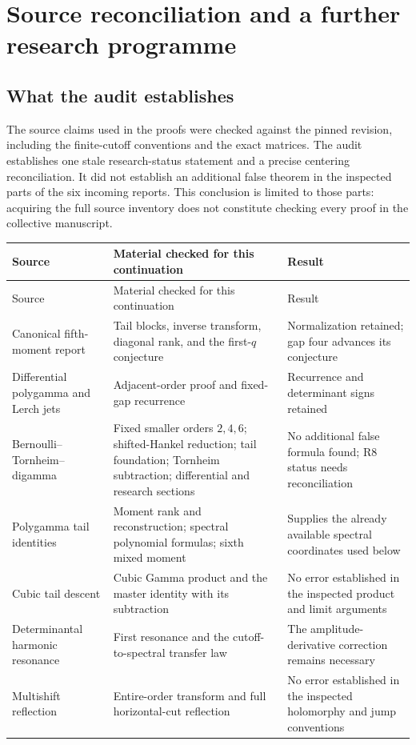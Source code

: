 \section{Source reconciliation and a further research programme}
\label{sec:audit}

\subsection{What the audit establishes}

The source claims used in the proofs were checked against the pinned
revision, including the finite-cutoff conventions and the exact matrices.
The audit establishes one stale research-status statement and a precise
centering reconciliation. It did not establish an additional false theorem
in the inspected parts of the six incoming reports. This conclusion is
limited to those parts: acquiring the full source inventory does not
constitute checking every proof in the collective manuscript.

\begin{longtable}{@{}>{\raggedright\arraybackslash}p{}>{\raggedright\arraybackslash}p{}>{\raggedright\arraybackslash}p{}@{}}
\toprule
Source & Material checked for this continuation & Result \\
\midrule
\endfirsthead
\toprule
Source & Material checked for this continuation & Result \\
\midrule
\endhead
Canonical fifth-moment report \cite{Canonical} &
Tail blocks, inverse transform, diagonal rank, and the first-$q$ conjecture &
Normalization retained; gap four advances its conjecture \\
Differential polygamma and Lerch jets \cite{Differential} &
Adjacent-order proof and fixed-gap recurrence &
Recurrence and determinant signs retained \\
Bernoulli--Tornheim--digamma \cite{Bernoulli} &
Fixed smaller orders $2,4,6$; shifted-Hankel reduction; tail foundation;
Tornheim subtraction; differential and research sections &
No additional false formula found; R8 status needs reconciliation \\
Polygamma tail identities \cite{Polygamma} &
Moment rank and reconstruction; spectral polynomial formulas; sixth
mixed moment &
Supplies the already available spectral coordinates used below \\
Cubic tail descent \cite{Cubic} &
Cubic Gamma product and the master identity with its subtraction &
No error established in the inspected product and limit arguments \\
Determinantal harmonic resonance \cite{Resonance} &
First resonance and the cutoff-to-spectral transfer law &
The amplitude-derivative correction remains necessary \\
Multishift reflection \cite{Multishift} &
Entire-order transform and full horizontal-cut reflection &
No error established in the inspected holomorphy and jump conventions \\
\bottomrule
\end{longtable}

